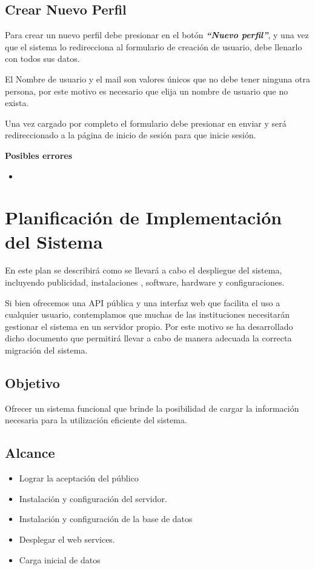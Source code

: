 \documentclass[a4paper,12pt]{article}
\begin{document}
\subsection{Crear Nuevo Perfil}
Para crear un nuevo perfil debe presionar en el botón \textbf{\textit{``Nuevo perfil''}}, y una vez que el sistema lo redirecciona al formulario de creación de usuario, debe llenarlo con todos sus datos.

El Nombre de usuario y el mail son valores únicos que no debe tener ninguna otra persona, por este motivo es necesario que elija un nombre de usuario que no exista. 

Una vez cargado por completo el formulario debe presionar en enviar y será redireccionado a la página de inicio de sesión para que inicie sesión.

\textbf{Posibles errores}
\begin{itemize}
	\item 
\end{itemize}

\section{Planificación de Implementación del Sistema}
En este plan se describirá como se llevará a cabo el despliegue del sistema, incluyendo publicidad, instalaciones , software, hardware y configuraciones.

Si bien ofrecemos una API pública y una interfaz web que facilita el uso a cualquier usuario, contemplamos que muchas de las instituciones necesitarán gestionar el sistema en un servidor propio. Por este motivo se ha desarrollado dicho documento que permitirá llevar a cabo de manera adecuada la correcta migración del sistema.

\subsection{Objetivo}


Ofrecer un sistema funcional que brinde la posibilidad de cargar la información necesaria para la utilización eficiente del sistema.
\subsection{Alcance}
\begin{itemize}
	\item Lograr la aceptación del público
	\item Instalación y configuración del servidor.
	\item Instalación y configuración de la base de datos
	\item Desplegar el web services.
	\item Carga inicial de datos
\end{itemize}
\end{document}
